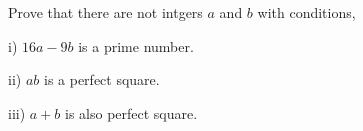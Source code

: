 Prove that there are not intgers $a$ and $b$ with conditions,

i) $16a-9b$ is a prime number.

ii) $ab$ is a perfect square.

iii) $a+b$ is also perfect square.